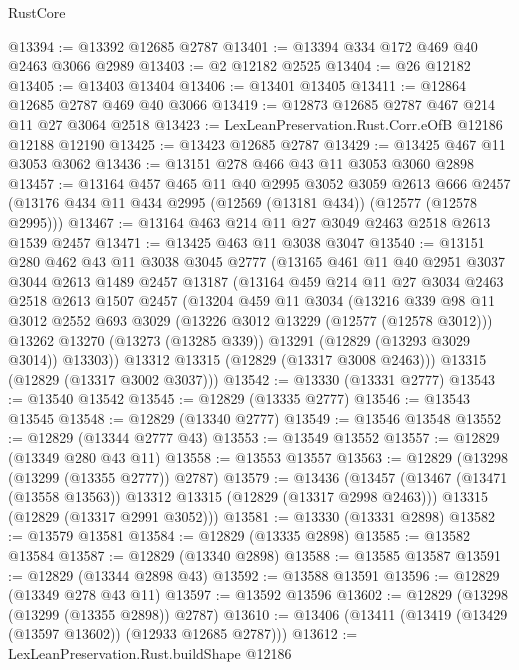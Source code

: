 \begin{lexlean}{RustCore}
\begin{coremodule}
@13394 := @13392 @12685 @2787
@13401 := @13394 @334 @172 @469 @40 @2463 @3066 @2989
@13403 := @2 @12182 @2525
@13404 := @26 @12182
@13405 := @13403 @13404
@13406 := @13401 @13405
@13411 := @12864 @12685 @2787 @469 @40 @3066
@13419 := @12873 @12685 @2787 @467 @214 @11 @27 @3064 @2518
@13423 := LexLeanPreservation.Rust.Corr.eOfB @12186 @12188 @12190
@13425 := @13423 @12685 @2787
@13429 := @13425 @467 @11 @3053 @3062
@13436 := @13151 @278 @466 @43 @11 @3053 @3060 @2898
@13457 := @13164
    @457
    @465
    @11
    @40
    @2995
    @3052
    @3059
    @2613
    @666
    @2457
    (@13176 @434 @11 @434 @2995 (@12569 (@13181 @434)) (@12577 (@12578 @2995)))
@13467 := @13164 @463 @214 @11 @27 @3049 @2463 @2518 @2613 @1539 @2457
@13471 := @13425 @463 @11 @3038 @3047
@13540 := @13151
    @280
    @462
    @43
    @11
    @3038
    @3045
    @2777
    (@13165
      @461
      @11
      @40
      @2951
      @3037
      @3044
      @2613
      @1489
      @2457
      @13187
      (@13164
        @459
        @214
        @11
        @27
        @3034
        @2463
        @2518
        @2613
        @1507
        @2457
        (@13204
          @459
          @11
          @3034
          (@13216
            @339
            @98
            @11
            @3012
            @2552
            @693
            @3029
            (@13226 @3012 @13229 (@12577 (@12578 @3012)))
            @13262
            @13270
            (@13273 (@13285 @339))
            @13291
            (@12829 (@13293 @3029 @3014))
            @13303))
        @13312
        @13315
        (@12829 (@13317 @3008 @2463)))
      @13315
      (@12829 (@13317 @3002 @3037)))
@13542 := @13330 (@13331 @2777)
@13543 := @13540 @13542
@13545 := @12829 (@13335 @2777)
@13546 := @13543 @13545
@13548 := @12829 (@13340 @2777)
@13549 := @13546 @13548
@13552 := @12829 (@13344 @2777 @43)
@13553 := @13549 @13552
@13557 := @12829 (@13349 @280 @43 @11)
@13558 := @13553 @13557
@13563 := @12829 (@13298 (@13299 (@13355 @2777)) @2787)
@13579 := @13436
    (@13457
      (@13467 (@13471 (@13558 @13563)) @13312 @13315 (@12829 (@13317 @2998 @2463)))
      @13315
      (@12829 (@13317 @2991 @3052)))
@13581 := @13330 (@13331 @2898)
@13582 := @13579 @13581
@13584 := @12829 (@13335 @2898)
@13585 := @13582 @13584
@13587 := @12829 (@13340 @2898)
@13588 := @13585 @13587
@13591 := @12829 (@13344 @2898 @43)
@13592 := @13588 @13591
@13596 := @12829 (@13349 @278 @43 @11)
@13597 := @13592 @13596
@13602 := @12829 (@13298 (@13299 (@13355 @2898)) @2787)
@13610 := @13406 (@13411 (@13419 (@13429 (@13597 @13602)) (@12933 @12685 @2787)))
@13612 := LexLeanPreservation.Rust.buildShape @12186

\end{coremodule}
\end{lexlean}
